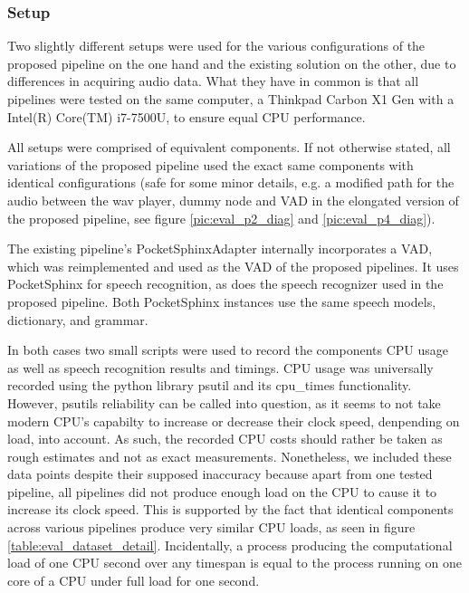 \subsubsection{Setup}
\label{eval:dataset:setup}

Two slightly different setups were used for the various configurations of the proposed pipeline on the one hand and the existing solution on the other, due to differences in acquiring audio data.
What they have in common is that all pipelines were tested on the same computer, a Thinkpad Carbon X1 Gen with a Intel(R) Core(TM) i7-7500U, to ensure equal CPU performance.

All setups were comprised of equivalent components. 
If not otherwise stated, all variations of the proposed pipeline used the exact same components with identical configurations (safe for some minor details, e.g. a modified path for the audio between the wav player, dummy node and VAD in the elongated version of the proposed pipeline, see figure \ref{pic:eval_p2_diag} and \ref{pic:eval_p4_diag}).

The existing pipeline's PocketSphinxAdapter internally incorporates a VAD, which was reimplemented and used as the VAD of the proposed pipelines.
It uses PocketSphinx for speech recognition, as does the speech recognizer used in the proposed pipeline. 
Both PocketSphinx instances use the same speech models, dictionary, and grammar.

In both cases two small scripts were used to record the components CPU usage as well as speech recognition results and timings.
CPU usage was universally recorded using the python library psutil \cite{psutil} and its cpu\_times functionality.
However, psutils reliability can be called into question, as it seems to not take modern CPU's capabilty to increase or decrease their clock speed, denpending on load, into account.
As such, the recorded CPU costs should rather be taken as rough estimates and not as exact measurements.
Nonetheless, we included these data points despite their supposed inaccuracy because apart from one tested pipeline, all pipelines did not produce enough load on the CPU to cause it to increase its clock speed.
This is supported by the fact that identical components across various pipelines produce very similar CPU loads, as seen in figure 
\ref{table:eval_dataset_detail}.
Incidentally, a process producing the computational load of one CPU second over any timespan is equal to the process running on one core of a CPU under full load for one second.


